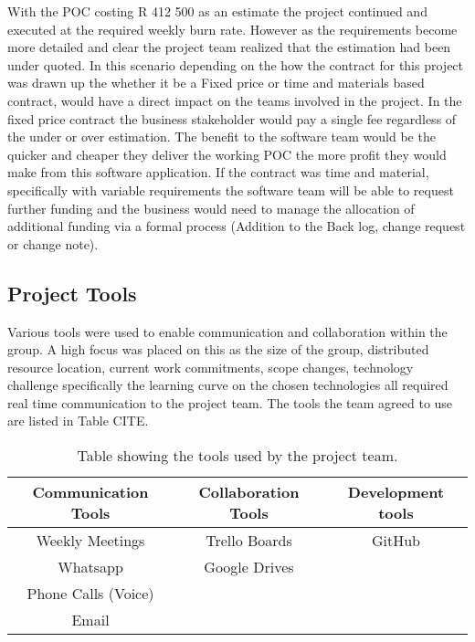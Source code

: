 \documentclass[12pt]{witseiepaper}
\begin{document}
With the POC costing R 412 500 as an estimate the project continued and executed at the required weekly burn rate. However as the requirements become more detailed and clear the project team realized that the estimation had been under quoted. In this scenario depending on the how the contract for this project was drawn up the whether it be a Fixed price or time and materials based contract, would have a direct impact on the teams involved in the project. In the fixed price contract the business stakeholder would pay a single fee regardless of the under or over estimation. The benefit to the software team would be the quicker and cheaper they deliver the working POC the more profit they would make from this software application. If the contract was time and material, specifically with variable requirements the software team will be able to request further funding and the business would need to manage the allocation of additional funding via a formal process (Addition to the Back log, change request or change note).

\subsection{Project Tools}
Various tools were used to enable communication and collaboration within the
group. A high focus was placed on this as the size of the group, distributed resource location, current work commitments, scope changes, technology challenge specifically the learning curve on the chosen technologies all required real time communication to the project team. The tools the team agreed to use are listed in Table CITE.

\begin{table}[htb] \caption{Table showing the tools used by the project team.} \label{tbl:Tools} 
	\begin{center}
		\begin{tabular}
			{|c|c|c|} %
			\hline Communication Tools & Collaboration Tools & Development tools \\
			\hline Weekly Meetings &  Trello Boards & GitHub\\
			\hline Whatsapp & Google Drives &\\
			\hline Phone Calls (Voice) &&\\
			\hline Email &&\\
			\hline 
		\end{tabular}
	\end{center}
\end{table}
\end{document}
